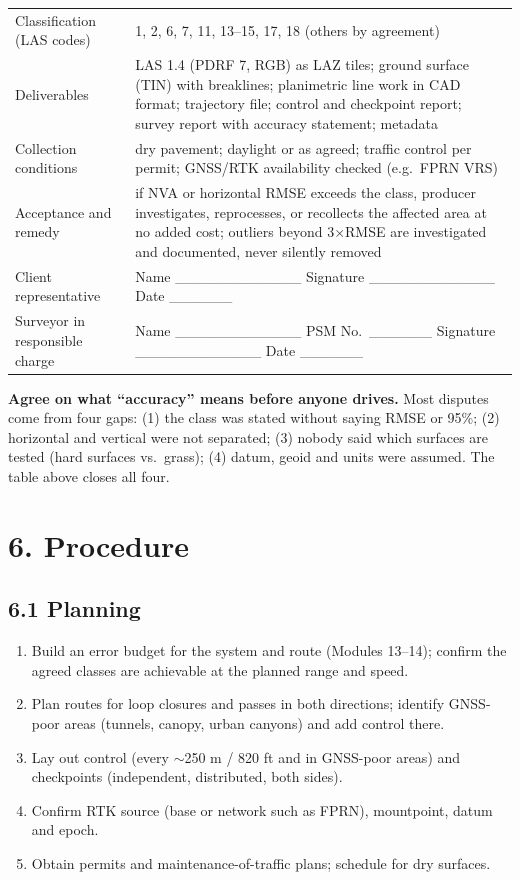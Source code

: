 \begin{center}
\begin{tabularx}{\linewidth}{>{\raggedright\arraybackslash}p{5.0cm}X}
Classification (LAS codes) & 1, 2, 6, 7, 11, 13--15, 17, 18 (others by agreement)\\
Deliverables & LAS 1.4 (PDRF 7, RGB) as LAZ tiles; ground surface (TIN) with breaklines; planimetric line work in CAD format; trajectory file; control and checkpoint report; survey report with accuracy statement; metadata\\
Collection conditions & dry pavement; daylight or as agreed; traffic control per permit; GNSS/RTK availability checked (e.g.\ FPRN VRS)\\
Acceptance and remedy & if NVA or horizontal RMSE exceeds the class, producer investigates, reprocesses, or recollects the affected area at no added cost; outliers beyond 3$\times$RMSE are investigated and documented, never silently removed\\\midrule
Client representative & Name \_\_\_\_\_\_\_\_\_\_\_\_ \quad Signature \_\_\_\_\_\_\_\_\_\_\_\_ \quad Date \_\_\_\_\_\_\\
Surveyor in responsible charge & Name \_\_\_\_\_\_\_\_\_\_\_\_ \quad PSM No.\ \_\_\_\_\_\_ \quad Signature \_\_\_\_\_\_\_\_\_\_\_\_ \quad Date \_\_\_\_\_\_\\\bottomrule
\end{tabularx}\end{center}

\begin{tip}
\textbf{Agree on what ``accuracy'' means before anyone drives.} Most disputes come from four gaps: (1) the class was stated without saying RMSE or 95\%; (2) horizontal and vertical were not separated; (3) nobody said which surfaces are tested (hard surfaces vs.\ grass); (4) datum, geoid and units were assumed. The table above closes all four.
\end{tip}

\section*{6. Procedure}
\subsection*{6.1 Planning}
\begin{enumerate}[label=\alph*.]
\item Build an error budget for the system and route (Modules 13--14); confirm the agreed classes are achievable at the planned range and speed.
\item Plan routes for loop closures and passes in both directions; identify GNSS-poor areas (tunnels, canopy, urban canyons) and add control there.
\item Lay out control (every $\sim$250 m / 820 ft and in GNSS-poor areas) and checkpoints (independent, distributed, both sides).
\item Confirm RTK source (base or network such as FPRN), mountpoint, datum and epoch.
\item Obtain permits and maintenance-of-traffic plans; schedule for dry surfaces.
\end{enumerate}

